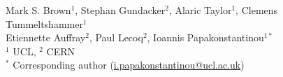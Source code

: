 Mark S. Brown${}^1$, Stephan Gundacker${}^2$, Alaric Taylor${}^1$, Clemens Tummeltshammer${}^1$\\ 
Etiennette Auffray${}^2$, Paul Lecoq${}^2$, Ioannis Papakonstantinou${}^{1*}$\\
${}^1$ UCL, ${}^2$ CERN\\
${}^*$ Corresponding author (\href{i.papakonstantinou@ucl.ac.uk}{i.papakonstantinou@ucl.ac.uk})
